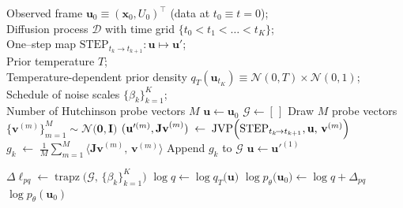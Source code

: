 \begin{algorithm}[H]
  \caption{Likelihood estimation for a thermodynamic map (diffusion model) using the Hutchinson trace estimator}
  \label{ch6:alg:diffusion-likelihood}
  \begin{algorithmic}[1]
    \REQUIRE Observed frame $\mathbf{u}_{0}\equiv (\mathbf{x}_0, U_0)^\top$ (data at $t_0\equiv t={0}$); \\
    Diffusion process $\mathcal{D}$ with time grid $\{t_{0}\!\!<\!\!t_{1}\!\!<\!\!\dots\!\!<\!\!t_{K}\}$; \\
    One–step map $\mathrm{STEP}_{t_{k}\!\rightarrow t_{k+1}} \colon \mathbf{u}\!\mapsto\!\mathbf{u}'$;  \\
    Prior temperature $T$;  \\
    Temperature-dependent prior density $q_T(\mathbf{u}_{t_K})\equiv \mathcal{N}(0,T) \times \mathcal{N}(0,1)$;  \\
    Schedule of noise scales $\{\beta_{k}\}_{k=1}^{K}$; \\
    Number of Hutchinson probe vectors $M$
    \STATE $\mathbf{u}\leftarrow\mathbf{u}_{0}$  
    \STATE $\mathcal{G}\leftarrow[\,]$          
      \STATE Draw $M$ probe vectors
             $\bigl\{\mathbf{v}^{(m)}\bigr\}_{m=1}^{M}
                    \sim\mathcal{N}\bigl(\mathbf{0},\mathbf{I}\bigr)$
        \STATE $(\mathbf{u}'^{(m)},\mathbf{Jv}^{(m)})\;
               \leftarrow\;
               \mathrm{JVP}\Bigl(
                 \mathrm{STEP}_{t_{k}\!\rightarrow t_{k+1}},
                 \mathbf{u},\,
                 \mathbf{v}^{(m)}
               \Bigr)$ 
      \ENDFOR
      \STATE $\displaystyle
             g_{k}\;\leftarrow\;
             \frac{1}{M}
             \sum_{m=1}^{M}
               \bigl\langle
                 \mathbf{Jv}^{(m)},\,\mathbf{v}^{(m)}
               \bigr\rangle$
      \STATE Append $g_{k}$ to $\mathcal{G}$
      \STATE $\mathbf{u}\leftarrow\mathbf{u}'^{(1)}$ 
    \ENDFOR

    \STATE $\displaystyle
           \Delta \ell_{pq}
           \leftarrow
           \operatorname{trapz}\bigl(\mathcal{G},\,
                                    \{\beta_{k}\}_{k=1}^{K}\bigr)$
    \STATE $\displaystyle
           \log q
           \leftarrow
           \log q_T\bigl(\mathbf{u}\bigr)$
    \STATE $\displaystyle
           \log p_{\theta}\bigl(\mathbf{u}_{0}\bigr)
           \leftarrow
           \log q + \Delta_{pq}$
    \RETURN $\log p_{\theta}(\mathbf{u}_{0})$
  \end{algorithmic}
\end{algorithm}

